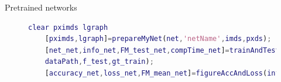 \documentclass[aspectratio=169,xcolor=dvipsnames]{beamer}
\begin{document}
\begin{frame}[fragile]{Pretrained networks}
	
	\begin{figure}
		\centering\hspace{5 mm}
\begin{minipage}{0.2\linewidth}\centering
	\tiny{\def\svgwidth{\linewidth}
	}
\end{minipage}\hfill
\begin{minipage}{0.7\linewidth}
	\centering
	\tiny{\def\svgwidth{0.85\linewidth}
	}
\end{minipage}
	\begin{minipage}{0.9\linewidth}
	\tiny{\begin{lstlisting}[language=Matlab,basicstyle=\tiny]
	clear pximds lgraph
	[pximds,lgraph]=prepareMyNet(net,'netName',imds,pxds);
	[net_net,info_net,FM_test_net,compTime_net]=trainAndTest(pximds,lgraph,...
	dataPath,f_test,gt_train);	
	[accuracy_net,loss_net,FM_mean_net]=figureAccAndLoss(info_net,FM_test_net)
	\end{lstlisting}}
\end{minipage}
	\end{figure}

	
	
\end{frame}
\end{document}
